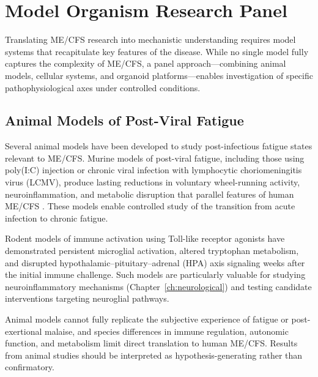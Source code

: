 \section{Model Organism Research Panel}
\label{sec:model-organisms}

Translating ME/CFS research into mechanistic understanding requires model systems that recapitulate key features of the disease. While no single model fully captures the complexity of ME/CFS, a panel approach---combining animal models, cellular systems, and organoid platforms---enables investigation of specific pathophysiological axes under controlled conditions.

\subsection{Animal Models of Post-Viral Fatigue}

Several animal models have been developed to study post-infectious fatigue states relevant to ME/CFS. Murine models of post-viral fatigue, including those using poly(I:C) injection or chronic viral infection with lymphocytic choriomeningitis virus (LCMV), produce lasting reductions in voluntary wheel-running activity, neuroinflammation, and metabolic disruption that parallel features of human ME/CFS \cite{Wirth2021}. These models enable controlled study of the transition from acute infection to chronic fatigue.

Rodent models of immune activation using Toll-like receptor agonists have demonstrated persistent microglial activation, altered tryptophan metabolism, and disrupted hypothalamic--pituitary--adrenal (HPA) axis signaling weeks after the initial immune challenge. Such models are particularly valuable for studying neuroinflammatory mechanisms (Chapter~\ref{ch:neurological}) and testing candidate interventions targeting neuroglial pathways.

\begin{limitation}
Animal models cannot fully replicate the subjective experience of fatigue or post-exertional malaise, and species differences in immune regulation, autonomic function, and metabolism limit direct translation to human ME/CFS. Results from animal studies should be interpreted as hypothesis-generating rather than confirmatory.
\end{limitation}

